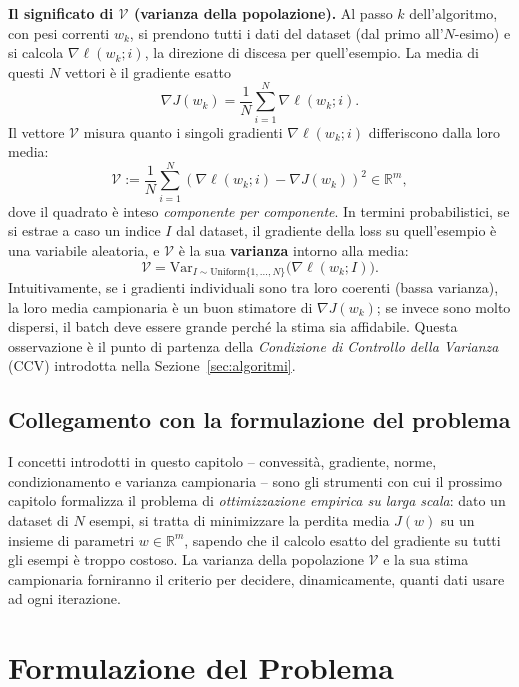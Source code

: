\documentclass[a4paper,12pt]{article}
\numberwithin{equation}{section}
\numberwithin{figure}{section}
\numberwithin{table}{section}
\newcommand{\R}{\mathbb{R}}
\begin{document}
\begin{notebox}
  \textbf{Il significato di $\mathcal{V}$ (varianza della popolazione).}
  Al passo $k$ dell'algoritmo, con pesi correnti $w_k$, si prendono tutti i
  dati del dataset (dal primo all'$N$-esimo) e si calcola
  $\nabla \ell(w_k; i)$, la direzione di discesa per quell'esempio. La media
  di questi $N$ vettori \`e il gradiente esatto
  \[
  \nabla J(w_k) = \frac{1}{N} \sum_{i=1}^N \nabla \ell(w_k; i).
  \]
  Il vettore $\mathcal{V}$ misura quanto i singoli gradienti
  $\nabla \ell(w_k; i)$ differiscono dalla loro media:
  \[
  \mathcal{V} := \frac{1}{N} \sum_{i=1}^{N}
  \left( \nabla \ell(w_k; i) - \nabla J(w_k) \right)^2 \in \mathbb{R}^m,
  \]
  dove il quadrato \`e inteso \emph{componente per componente}. In termini
  probabilistici, se si estrae a caso un indice $I$ dal dataset, il gradiente
  della loss su quell'esempio \`e una variabile aleatoria, e $\mathcal{V}$
  \`e la sua \textbf{varianza} intorno alla media:
  \[
  \mathcal{V} =
  \mathrm{Var}_{I \sim \mathrm{Uniform}\{1,\dots,N\}}\bigl(\nabla \ell(w_k; I)\bigr).
  \]
  Intuitivamente, se i gradienti individuali sono tra loro coerenti (bassa
  varianza), la loro media campionaria \`e un buon stimatore di $\nabla J(w_k)$;
  se invece sono molto dispersi, il batch deve essere grande perch\'e la stima
  sia affidabile. Questa osservazione \`e il punto di partenza della
  \emph{Condizione di Controllo della Varianza} (CCV) introdotta nella
  Sezione~\ref{sec:algoritmi}.
\end{notebox}


\subsection{Collegamento con la formulazione del problema}

I concetti introdotti in questo capitolo -- convessit\`a, gradiente,
norme, condizionamento e varianza campionaria -- sono gli strumenti con
cui il prossimo capitolo formalizza il problema di \emph{ottimizzazione
empirica su larga scala}: dato un dataset di $N$ esempi, si tratta di
minimizzare la perdita media $J(w)$ su un insieme di parametri
$w\in\R^m$, sapendo che il calcolo esatto del gradiente su tutti gli
esempi \`e troppo costoso. La varianza della popolazione $\mathcal{V}$ e
la sua stima campionaria forniranno il criterio per decidere,
dinamicamente, quanti dati usare ad ogni iterazione.
\newpage

\section{Formulazione del Problema}\label{sec:formulazione}
\end{document}
